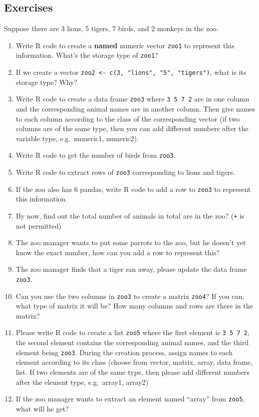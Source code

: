 \documentclass[
]{book}
\providecommand{\tightlist}{%
  \setlength{\itemsep}{0pt}\setlength{\parskip}{0pt}}
\begin{document}
\hypertarget{exercises-26}{%
\subsection{Exercises}\label{exercises-26}}

Suppose there are 3 lions, 5 tigers, 7 birds, and 2 monkeys in the zoo.

\begin{enumerate}
\def\labelenumi{\arabic{enumi}.}
\tightlist
\item
  Write R code to create a \textbf{named} numeric vector \texttt{zoo1} to represent this information. What's the storage type of \texttt{zoo1}?
\item
  If we create a vector \texttt{zoo2\ \textless{}-\ c(3,\ "lions",\ "5",\ "tigers")}, what is its storage type? Why?
\item
  Write R code to create a data frame \texttt{zoo3} where \texttt{3\ 5\ 7\ 2} are in one column and the corresponding animal names are in another column. Then give names to each column according to the class of the corresponding vector (if two columns are of the same type, then you can add different numbers after the variable type, e.g.~numeric1, numeric2).
\item
  Write R code to get the number of birds from \texttt{zoo3}.
\item
  Write R code to extract rows of \texttt{zoo3} corresponding to lions and tigers.
\item
  If the zoo also has 6 pandas, write R code to add a row to \texttt{zoo3} to represent this information.
\item
  By now, find out the total number of animals in total are in the zoo? (\texttt{+} is not permitted)
\item
  The zoo manager wants to put some parrots to the zoo, but he doesn't yet know the exact number, how can you add a row to represent this?
\item
  The zoo manager finds that a tiger ran away, please update the data frame \texttt{zoo3}.
\item
  Can you use the two columns in \texttt{zoo3} to create a matrix \texttt{zoo4}? If you can, what type of matrix it will be? How many columns and rows are there in the matrix?
\item
  Please write R code to create a list \texttt{zoo5} where the first element is \texttt{3\ 5\ 7\ 2}, the second element contains the corresponding animal names, and the third element being \texttt{zoo3}. During the creation process, assign names to each element according to its class (choose from vector, matrix, array, data frame, list. If two elements are of the same type, then please add different numbers after the element type, e.g.~array1, array2)
\item
  If the zoo manager wants to extract an element named ``array'' from \texttt{zoo5}, what will he get?
\end{enumerate}
\end{document}
